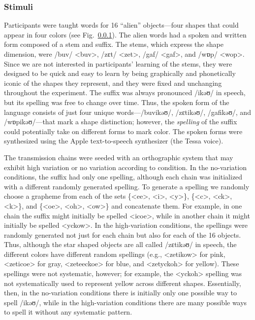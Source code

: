 \documentclass[doc,biblatex]{apa7}
\begin{document}
\subsubsection{Stimuli}

Participants were taught words for 16 ``alien'' objects---four shapes that could appear in four colors (see Fig.~\ref{}). The alien words had a spoken and written form composed of a stem and suffix. The stems, which express the shape dimension, were /buv/ <buv>, /zɛt/ <zet>, /gaf/ <gaf>, and /wɒp/ <wop>. Since we are not interested in participants' learning of the stems, they were designed to be quick and easy to learn by being graphically and phonetically iconic of the shapes they represent, and they were fixed and unchanging throughout the experiment. The suffix was always pronounced /ikəʊ/ in speech, but its spelling was free to change over time. Thus, the spoken form of the language consists of just four unique words---/buvikəʊ/, /zɛtikəʊ/, /gafikəʊ/, and /wɒpikəʊ/---that mark a shape distinction; however, the \textit{spelling} of the suffix could potentially take on different forms to mark color. The spoken forms were synthesized using the Apple text-to-speech synthesizer (the Tessa voice).

The transmission chains were seeded with an orthographic system that may exhibit high variation or no variation according to condition. In the no-variation conditions, the suffix had only one spelling, although each chain was initialized with a different randomly generated spelling. To generate a spelling we randomly choose a grapheme from each of the sets \{<ee>, <i>, <y>\}, \{<c>, <ck>, <k>\}, and \{<oe>, <oh>, <ow>\} and concatenate them. For example, in one chain the suffix might initially be spelled <icoe>, while in another chain it might initially be spelled <yckow>. In the high-variation conditions, the spellings were randomly generated not just for each chain but also for each of the 16 objects. Thus, although the star shaped objects are all called /zɛtikəʊ/ in speech, the different colors have different random spellings (e.g., <zetikow> for pink, <zeticoe> for gray, <zeteeckoe> for blue, and <zetyckoh> for yellow). These spellings were not systematic, however; for example, the <yckoh> spelling was not systematically used to represent yellow across different shapes. Essentially, then, in the no-variation conditions there is initially only one possible way to spell /ikəʊ/, while in the high-variation conditions there are many possible ways to spell it without any systematic pattern.
\end{document}
